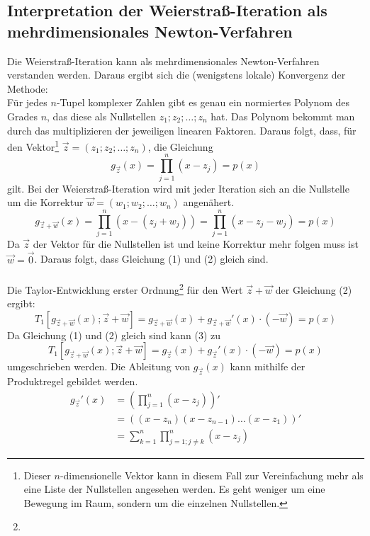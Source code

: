 \documentclass[12pt]{article}
\begin{document}
\subsection{Interpretation der Weierstraß-Iteration als mehrdimensionales Newton-Verfahren}
Die Weierstraß-Iteration kann als mehrdimensionales Newton-Verfahren verstanden werden. Daraus ergibt sich die (wenigstens lokale) Konvergenz der Methode: \\
Für jedes $n$-Tupel komplexer Zahlen gibt es genau ein normiertes Polynom des Grades $n$, das diese als Nullstellen $z_1;z_2;\dots;z_n$ hat. Das Polynom bekommt man durch das multiplizieren der jeweiligen linearen Faktoren. Daraus folgt, dass, für den Vektor\footnote{Dieser $n$-dimensionelle Vektor kann in diesem Fall zur Vereinfachung mehr als eine Liste der Nullstellen angesehen werden. Es geht weniger um eine Bewegung im Raum, sondern um die einzelnen Nullstellen.} $\vec{z} = (z_1;z_2;\dots;z_n)$, die Gleichung
\begin{equation}
    g_{\vec{z}}(x)=\prod_{j=1}^{n}(x-z_j)=p(x)
\end{equation}
gilt. Bei der Weierstraß-Iteration wird mit jeder Iteration sich an die Nullstelle um die Korrektur $\vec{w} = (w_1;w_2;\dots;w_n)$ angenähert.
\begin{equation}
    g_{\vec{z} + \vec{w}}(x)=\prod_{j=1}^{n}(x-(z_j+w_j))=\prod_{j=1}^{n}(x-z_j-w_j)=p(x)
\end{equation}
Da $\vec{z}$ der Vektor für die Nullstellen ist und keine Korrektur mehr folgen muss ist $\vec{w} = \vec{0}$. Daraus folgt, dass Gleichung (1) und (2) gleich sind. \\\\
Die Taylor-Entwicklung erster Ordnung\footnote{} für den Wert $\vec{z} + \vec{w}$ der Gleichung (2) ergibt:
\begin{equation}
    T_1[g_{\vec{z} + \vec{w}}(x);\vec{z} + \vec{w}] = g_{\vec{z} + \vec{w}}(x)+g_{\vec{z} + \vec{w}}'(x)\cdot (-\vec{w}) = p(x)
\end{equation}
Da Gleichung (1) und (2) gleich sind kann (3) zu
\begin{equation}
    T_1[g_{\vec{z} + \vec{w}}(x);\vec{z} + \vec{w}] = g_{\vec{z}}(x)+g_{\vec{z}}'(x)\cdot (-\vec{w}) = p(x)
\end{equation}
umgeschrieben werden. Die Ableitung von $g_{\vec{z}}(x)$ kann mithilfe der Produktregel gebildet werden.
\begin{align*}
    g_{\vec{z}}'(x) &= (\prod_{j=1}^{n}(x-z_j))' \\
                    &= ((x-z_n)(x-z_{n-1})\dots(x-z_1))' \\
                    &= \sum_{k=1}^{n}\prod_{j=1;j\neq k}^{n}(x-z_j)
\end{align*}
\end{document}

